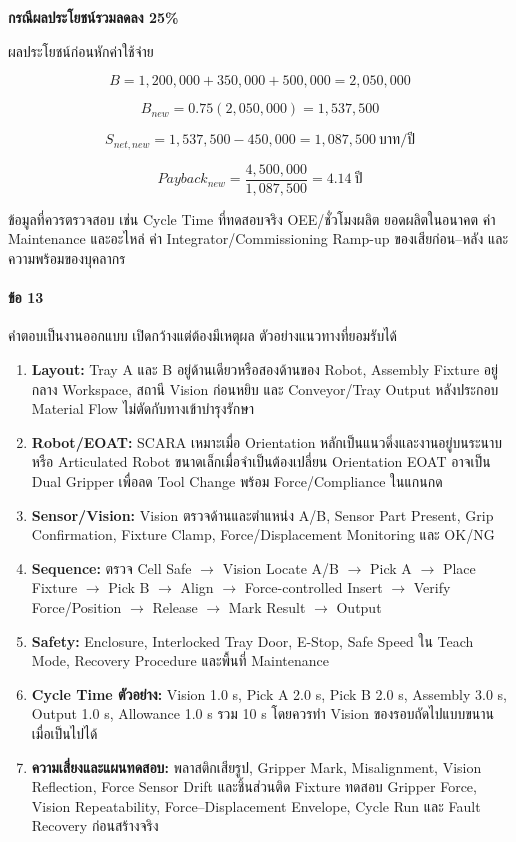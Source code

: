 \textbf{กรณีผลประโยชน์รวมลดลง 25\%}

ผลประโยชน์ก่อนหักค่าใช้จ่าย

\[
B=1{,}200{,}000+350{,}000+500{,}000=2{,}050{,}000
\]

\[
B_{new}=0.75(2{,}050{,}000)=1{,}537{,}500
\]

\[
S_{net,new}=1{,}537{,}500-450{,}000=1{,}087{,}500\ \text{บาท/ปี}
\]

\[
Payback_{new}=\frac{4{,}500{,}000}{1{,}087{,}500}=4.14\ \text{ปี}
\]

ข้อมูลที่ควรตรวจสอบ เช่น Cycle Time ที่ทดสอบจริง OEE/ชั่วโมงผลิต ยอดผลิตในอนาคต ค่า Maintenance และอะไหล่ ค่า Integrator/Commissioning Ramp-up ของเสียก่อน–หลัง และความพร้อมของบุคลากร

\paragraph{ข้อ 13}

คำตอบเป็นงานออกแบบ เปิดกว้างแต่ต้องมีเหตุผล ตัวอย่างแนวทางที่ยอมรับได้

\begin{enumerate}
    \item \textbf{Layout:} Tray A และ B อยู่ด้านเดียวหรือสองด้านของ Robot, Assembly Fixture อยู่กลาง Workspace, สถานี Vision ก่อนหยิบ และ Conveyor/Tray Output หลังประกอบ Material Flow ไม่ตัดกับทางเข้าบำรุงรักษา
    \item \textbf{Robot/EOAT:} SCARA เหมาะเมื่อ Orientation หลักเป็นแนวดิ่งและงานอยู่บนระนาบ หรือ Articulated Robot ขนาดเล็กเมื่อจำเป็นต้องเปลี่ยน Orientation EOAT อาจเป็น Dual Gripper เพื่อลด Tool Change พร้อม Force/Compliance ในแกนกด
    \item \textbf{Sensor/Vision:} Vision ตรวจด้านและตำแหน่ง A/B, Sensor Part Present, Grip Confirmation, Fixture Clamp, Force/Displacement Monitoring และ OK/NG
    \item \textbf{Sequence:} ตรวจ Cell Safe \(\rightarrow\) Vision Locate A/B \(\rightarrow\) Pick A \(\rightarrow\) Place Fixture \(\rightarrow\) Pick B \(\rightarrow\) Align \(\rightarrow\) Force-controlled Insert \(\rightarrow\) Verify Force/Position \(\rightarrow\) Release \(\rightarrow\) Mark Result \(\rightarrow\) Output
    \item \textbf{Safety:} Enclosure, Interlocked Tray Door, E-Stop, Safe Speed ใน Teach Mode, Recovery Procedure และพื้นที่ Maintenance
    \item \textbf{Cycle Time ตัวอย่าง:} Vision 1.0 s, Pick A 2.0 s, Pick B 2.0 s, Assembly 3.0 s, Output 1.0 s, Allowance 1.0 s รวม 10 s โดยควรทำ Vision ของรอบถัดไปแบบขนานเมื่อเป็นไปได้
    \item \textbf{ความเสี่ยงและแผนทดสอบ:} พลาสติกเสียรูป, Gripper Mark, Misalignment, Vision Reflection, Force Sensor Drift และชิ้นส่วนติด Fixture ทดสอบ Gripper Force, Vision Repeatability, Force–Displacement Envelope, Cycle Run และ Fault Recovery ก่อนสร้างจริง
\end{enumerate}

